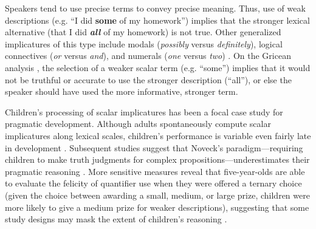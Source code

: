 \documentclass[10pt,letterpaper]{article}
\begin{document}
Speakers tend to use precise terms to convey precise meaning. Thus, use of weak descriptions (e.g. ``I did \textbf{some} of my homework'') implies that the stronger lexical alternative (that I did \emph{\textbf{all}} of my homework) is not true. Other generalized implicatures of this type include modals (\emph{possibly} versus \emph{definitely}), logical connectives (\emph{or} versus \emph{and}), and numerals (\emph{one} versus \emph{two}) \citep{horn1984}.  On the Gricean analysis \citep{grice1975}, the selection of a weaker scalar term (e.g. ``some'') implies that it would not be truthful or accurate to use the stronger description (``all''), or else the speaker should have used the more informative, stronger term. 


Children's processing of scalar implicatures has been a focal case study for pragmatic development. Although adults spontaneously compute scalar implicatures along lexical scales, children's performance is variable even fairly late in development \citep{noveck2001}.  Subsequent studies suggest that Noveck's paradigm---requiring children to make truth judgments for complex propositions---underestimates their pragmatic reasoning \citep{guasti2005,papafragou2003, papafragou2004}.  More sensitive measures reveal that five-year-olds are able to evaluate the felicity of quantifier use when they were offered a ternary choice (given the choice between awarding a small, medium, or large prize, children were more likely to give a medium prize for weaker descriptions), suggesting that some study designs may mask the extent of children's reasoning \citep{katsos2011}.  
\end{document}
